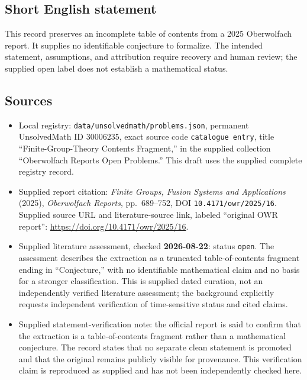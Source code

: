\documentclass[11pt]{article}
\begin{document}
\subsection{Short English statement}
This record preserves an incomplete table of contents from a 2025 Oberwolfach report. It supplies no identifiable conjecture to formalize. The intended statement, assumptions, and attribution require recovery and human review; the supplied open label does not establish a mathematical status.
\subsection{Sources}
\begin{itemize}
\item Local registry: \texttt{data/unsolvedmath/problems.json}, permanent UnsolvedMath ID \(30006235\), exact source code \texttt{catalogue entry}, title ``Finite-Group-Theory Contents Fragment,'' in the supplied collection ``Oberwolfach Reports Open Problems.'' This draft uses the supplied complete registry record.
\item Supplied report citation: \textit{Finite Groups, Fusion Systems and Applications} (2025), \textit{Oberwolfach Reports}, pp.~689--752, DOI \texttt{10.4171/owr/2025/16}. Supplied source URL and literature-source link, labeled ``original OWR report'': \url{https://doi.org/10.4171/owr/2025/16}.
\item Supplied literature assessment, checked \textbf{2026-08-22}: status \texttt{open}. The assessment describes the extraction as a truncated table-of-contents fragment ending in ``Conjecture,'' with no identifiable mathematical claim and no basis for a stronger classification. This is supplied dated curation, not an independently verified literature assessment; the background explicitly requests independent verification of time-sensitive status and cited claims.
\item Supplied statement-verification note: the official report is said to confirm that the extraction is a table-of-contents fragment rather than a mathematical conjecture. The record states that no separate clean statement is promoted and that the original remains publicly visible for provenance. This verification claim is reproduced as supplied and has not been independently checked here.
\end{itemize}
\end{document}
